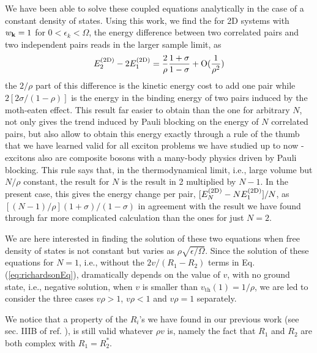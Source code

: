 \documentclass[aps,prb,showpacs,reprint]{revtex4-1}
\begin{document}
We have been able to solve these coupled equations analytically in the case of a constant density of states\cite{combescotBCS}.  Using this work, we find the for 2D systems with $w_{\mathbf{k}}=1$ for $0<\epsilon_k<\Omega$, the energy difference between two correlated pairs and two independent pairs reads in the larger sample limit, as 
\begin{equation}
E^{{{\text{(2D)}}}}_2-2E_1^{{{\text{(2D)}}}}=\frac{2}{\rho}\frac{1+\sigma}{1-\sigma}+\text{O}(\frac{1}{\rho^2})
\label{eq:}
\end{equation}
the $2/\rho$ part of this difference is the kinetic energy cost to add one pair while $2[2\sigma/(1-\rho)]$ is the energy in the binding energy of two pairs induced by the moth-eaten effect. This result far easier to obtain than the one for arbitrary $N$, not only gives the trend induced by Pauli blocking on the energy of $N$ correlated pairs, but also allow to obtain this energy exactly through a rule of the thumb that we have learned valid for all exciton problems we have studied up to now - excitons also are composite bosons with a many-body physics driven by Pauli blocking.  This rule says that, in the thermodynamical limit, i.e., large volume but $N/\rho$ constant, the result for $N$ is the result in 2 multiplied by $N-1$.  In the present case, this gives the energy change per pair, $[E^{{{\text{(2D)}}}}_N-NE^{{{\text{(2D)}}}}_1]/N$, as $[(N-1)/\rho](1+\sigma)/(1-\sigma)$ in agreement with the result we have found through far more complicated calculation than the ones for just $N=2$.

We are here interested in finding the solution of these two equations when free density of states is not constant but varies as $\rho\sqrt{\epsilon/\Omega}$.  Since the solution of these equations for $N=1$, i.e., without the $2v/(R_1-R_2)$ terms in Eq. (\ref{eq:richardsonEq}), dramatically depends on the value of $v$, with no ground state, i.e., negative solution, when $v$ is smaller than $v_{\text{th}}(1)=1/\rho$, we are led to consider the three cases $v\rho>1$, $v\rho<1$ and $v\rho=1$ separately. 

We notice that a property of the $R_i$'s we have found in our previous work (see sec. IIIB of ref. \cite{combescotBCS}), is still valid whatever $\rho{}v$ is, namely the fact that $R_1$ and $R_2$ are both complex with $R_1=R_2^*$.%

\end{document}
